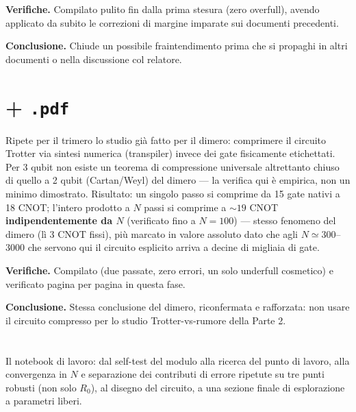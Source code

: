 \documentclass[11pt,a4paper]{article}
\begin{document}
\textbf{Verifiche.} Compilato pulito fin dalla prima stesura (zero overfull),
avendo applicato da subito le correzioni di margine imparate sui documenti
precedenti.

\textbf{Conclusione.} Chiude un possibile fraintendimento prima che si propaghi
in altri documenti o nella discussione col relatore.

\section*{\texttt{} + \texttt{.pdf}}

Ripete per il trimero lo studio già fatto per il dimero: comprimere il circuito
Trotter via sintesi numerica (transpiler) invece dei gate fisicamente etichettati.
Per 3 qubit non esiste un teorema di compressione universale altrettanto chiuso di
quello a 2 qubit (Cartan/Weyl) del dimero — la verifica qui è empirica, non un
minimo dimostrato. Risultato: un singolo passo si comprime da 15 gate nativi a 18
CNOT; l'intero prodotto a $N$ passi si comprime a $\sim19$ CNOT
\textbf{indipendentemente da $N$} (verificato fino a $N=100$) — stesso fenomeno del
dimero (lì 3 CNOT fissi), più marcato in valore assoluto dato che agli
$N\simeq300$--$3000$ che servono qui il circuito esplicito arriva a decine di
migliaia di gate.

\textbf{Verifiche.} Compilato (due passate, zero errori, un solo underfull
cosmetico) e verificato pagina per pagina in questa fase.

\textbf{Conclusione.} Stessa conclusione del dimero, riconfermata e rafforzata: non
usare il circuito compresso per lo studio Trotter-vs-rumore della Parte 2.

\section*{\texttt{}}

Il notebook di lavoro: dal self-test del modulo alla ricerca del punto di lavoro,
alla convergenza in $N$ e separazione dei contributi di errore ripetute su tre punti
robusti (non solo $R_0$), al disegno del circuito, a una sezione finale di
esplorazione a parametri liberi.
\end{document}
